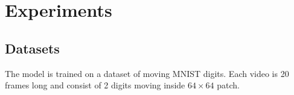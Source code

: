 \documentclass[twoside,a4paper,article]{combine}
\begin{document}
\section{Experiments}
\subsection{Datasets}
The model is trained on a dataset of moving MNIST digits. Each video is 20 frames long and consist of 2 digits moving inside $64\times64$
patch.






\end{document}
